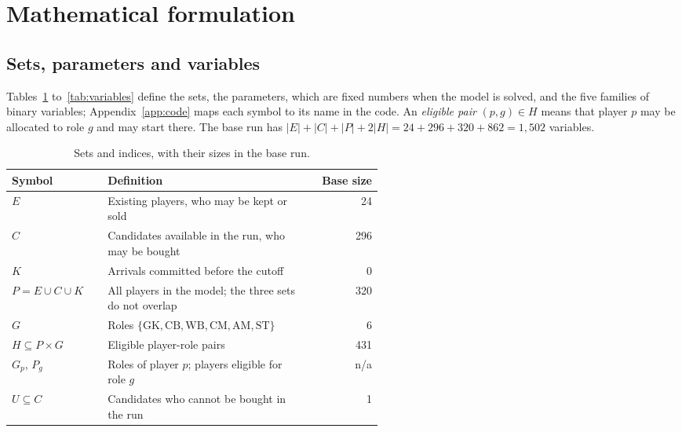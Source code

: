 \section{Mathematical formulation}\label{sec:model}

\subsection{Sets, parameters and variables}

Tables~\ref{tab:sets} to~\ref{tab:variables} define the sets, the parameters, which are fixed numbers when the model is solved, and the five families of binary variables; Appendix~\ref{app:code} maps each symbol to its name in the code. An \emph{eligible pair} $(p,g) \in H$ means that player $p$ may be allocated to role $g$ and may start there. The base run has $|E| + |C| + |P| + 2|H| = 24 + 296 + 320 + 862 = 1{,}502$ variables.

\begin{table}[!htbp]
\centering
\caption{Sets and indices, with their sizes in the base run.}\label{tab:sets}
\begin{tabular}{@{}l >{\raggedright\arraybackslash}p{0.55\linewidth} r@{}}
\toprule
Symbol & Definition & Base size \\
\midrule
$E$ & Existing players, who may be kept or sold & 24 \\
$C$ & Candidates available in the run, who may be bought & 296 \\
$K$ & Arrivals committed before the cutoff & 0 \\
$P = E \cup C \cup K$ & All players in the model; the three sets do not overlap & 320 \\
$G$ & Roles $\{\mathrm{GK}, \mathrm{CB}, \mathrm{WB}, \mathrm{CM}, \mathrm{AM}, \mathrm{ST}\}$ & 6 \\
$H \subseteq P \times G$ & Eligible player-role pairs & 431 \\
$G_p$, $P_g$ & Roles of player $p$; players eligible for role $g$ & n/a \\
$U \subseteq C$ & Candidates who cannot be bought in the run & 1 \\
\bottomrule
\end{tabular}
\end{table}

